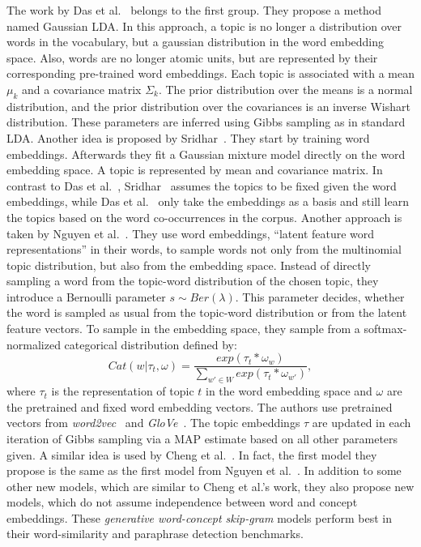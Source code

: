 \documentclass{sig-alternate-05-2015}
\begin{document}
The work by Das et al.~\cite{Das2015} belongs to the first group. They propose a method named Gaussian LDA.
In this approach, a topic is no longer a distribution over words in the vocabulary, but a gaussian distribution in the word embedding space.
Also, words are no longer atomic units, but are represented by their corresponding pre-trained word embeddings.
Each topic is associated with a mean $\mu_k$ and a covariance matrix $\Sigma_k$.
The prior distribution over the means is a normal distribution, and the prior distribution over the covariances is an inverse Wishart distribution.
These parameters are inferred using Gibbs sampling as in standard LDA. %
Another idea is proposed by Sridhar~\cite{Sridhar2015}.
They start by training word embeddings.
Afterwards they fit a Gaussian mixture model directly on the word embedding space.
A topic is represented by mean and covariance matrix.
In contrast to Das et al.~\cite{Das2015}, Sridhar~\cite{Sridhar2015} assumes the topics to be fixed given the word embeddings, while Das et al.~\cite{Das2015} only take the embeddings as a basis and still learn the topics based on the word co-occurrences in the corpus.
Another approach is taken by Nguyen et al.~\cite{Nguyen2015}.
They use word embeddings, ``latent feature word representations'' in their words, to sample words not only from the multinomial topic distribution, but also from the embedding space.
Instead of directly sampling a word from the topic-word distribution of the chosen topic, they introduce a Bernoulli parameter $s \sim Ber(\lambda)$.
This parameter decides, whether the word is sampled as usual from the topic-word distribution or from the latent feature vectors.
To sample in the embedding space, they sample from a softmax-normalized categorical distribution defined by:
\begin{equation*}
       Cat(w | \tau_t, \omega) = \frac{exp(\tau_t * \omega_w)}{\sum_{w' \in W} exp(\tau_t * \omega_{w'})},
\end{equation*}
where $\tau_t$ is the representation of topic $t$ in the word embedding space and $\omega$ are the pretrained and fixed word embedding vectors.
The authors use pretrained vectors from \emph{word2vec}~\cite{Mikolov2013a} and \emph{GloVe}~\cite{Pennington2014}.
The topic embeddings $\tau$ are updated in each iteration of Gibbs sampling via a MAP estimate based on all other parameters given.
A similar idea is used by Cheng et al.~\cite{Cheng2015}.
In fact, the first model they propose is the same as the first model from Nguyen et al.~\cite{Nguyen2015}.
In addition to some other new models, which are similar to Cheng et al.'s work, they also propose new models, which do not assume independence between word and concept embeddings.
These \emph{generative word-concept skip-gram} models perform best in their word-similarity and paraphrase detection benchmarks.
\end{document}
